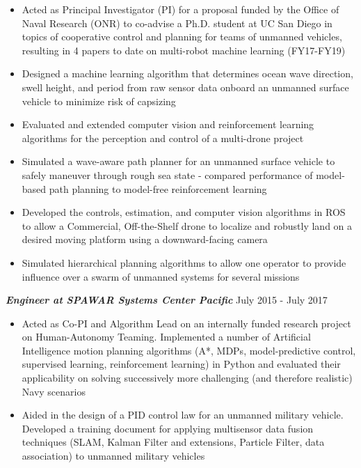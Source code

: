\documentclass{res}
\begin{document}
\begin{resume}
 \vspace*{-0ex} 
\begin{itemize}
\item Acted as Principal Investigator (PI) for a proposal funded by the Office of Naval Research (ONR) to co-advise a Ph.D. student at UC San Diego in topics of cooperative control and planning for teams of unmanned vehicles, resulting in 4 papers to date on multi-robot machine learning (FY17-FY19)
\item Designed a machine learning algorithm that determines ocean wave direction, swell height, and period from raw sensor data onboard an unmanned surface vehicle to minimize risk of capsizing
\item Evaluated and extended computer vision and reinforcement learning algorithms for the perception and control of a multi-drone project
\item Simulated a wave-aware path planner for an unmanned surface vehicle to safely maneuver through rough sea state -  compared performance of model-based path planning to model-free reinforcement learning
\item Developed the controls, estimation, and computer vision algorithms in ROS to allow a Commercial, Off-the-Shelf drone to localize and robustly land on a desired moving platform using a downward-facing camera
\item Simulated hierarchical planning algorithms to allow one operator to provide influence over a swarm of unmanned systems for several missions 
\end{itemize}
\vspace*{-1ex}
{\sl \bf Engineer at SPAWAR Systems Center Pacific} \hfill July 2015 - July 2017 
\begin{itemize}
\item Acted as Co-PI and Algorithm Lead on an internally funded research project on Human-Autonomy Teaming. Implemented a number of Artificial Intelligence motion planning algorithms (A*, MDPs, model-predictive control, supervised learning, reinforcement learning) in Python and evaluated their applicability on solving successively more challenging (and therefore realistic) Navy scenarios
\item Aided in the design of a PID control law for an unmanned military vehicle.  Developed a training document for applying multisensor data fusion techniques (SLAM, Kalman Filter and extensions, Particle Filter, data association) to unmanned military vehicles
\end{itemize}
\vspace*{-1ex}

\end{resume}
\end{document}
